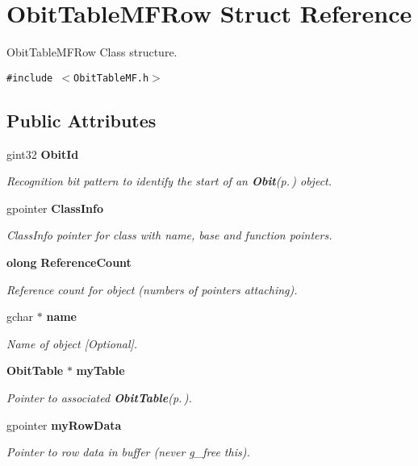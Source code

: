 \section{Obit\-Table\-MFRow Struct Reference}
\label{structObitTableMFRow}
Obit\-Table\-MFRow Class structure.  


{\tt \#include $<$Obit\-Table\-MF.h$>$}

\subsection*{Public Attributes}
\begin{CompactItemize}
\item 
gint32 {\bf Obit\-Id}
\begin{CompactList}\small\item\em Recognition bit pattern to identify the start of an {\bf Obit}{\rm (p.\,\pageref{structObit})} object. \item\end{CompactList}\item 
gpointer {\bf Class\-Info}
\begin{CompactList}\small\item\em Class\-Info pointer for class with name, base and function pointers. \item\end{CompactList}\item 
{\bf olong} {\bf Reference\-Count}
\begin{CompactList}\small\item\em Reference count for object (numbers of pointers attaching). \item\end{CompactList}\item 
gchar $\ast$ {\bf name}
\begin{CompactList}\small\item\em Name of object [Optional]. \item\end{CompactList}\item 
{\bf Obit\-Table} $\ast$ {\bf my\-Table}
\begin{CompactList}\small\item\em Pointer to associated {\bf Obit\-Table}{\rm (p.\,\pageref{structObitTable})}. \item\end{CompactList}\item 
gpointer {\bf my\-Row\-Data}
\begin{CompactList}\small\item\em Pointer to row data in buffer (never g\_\-free this). \item\end{CompactList}\item 

\end{CompactItemize}
